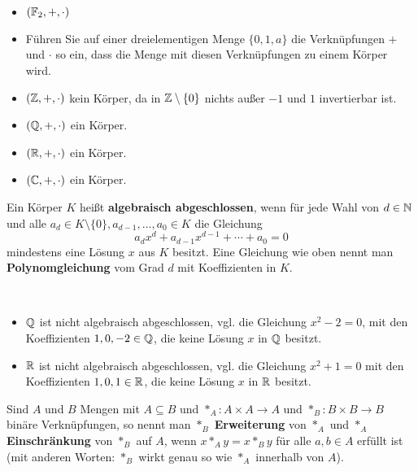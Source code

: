 \begin{bsp}\ 
\begin{itemize} 
	\item $(\mathbb{F}_2,+,\cdot)$
	\item Führen Sie auf einer dreielementigen Menge $\{0,1,a\}$ die Verknüpfungen $+$ und $\cdot$ so ein, dass die Menge mit diesen Verknüpfungen zu einem Körper wird. 
	\item $(\mathbb{Z},+,\cdot)$ kein Körper, da in $\mathbb{Z} \setminus \{0\}$ nichts außer $-1$ und $1$ invertierbar ist. 
	\item $(\mathbb{Q},+,\cdot)$ ein Körper. 
	\item $(\mathbb{R}, + ,\cdot)$ ein Körper. 
	\item $(\mathbb{C}, + ,\cdot)$ ein Körper. 
\end{itemize} 
\end{bsp} 

\begin{defn}
	Ein Körper $K$ heißt \textbf{algebraisch abgeschlossen}, wenn für jede Wahl von $d \in \mathbb{N}$ und alle $a_d \in K \setminus \{0\}, a_{d-1},\ldots,a_0 \in K$ die Gleichung 
	\[
	a_d x^d + a_{d-1} x^{d-1} + \cdots + a_0 = 0
	\]
	mindestens eine Lösung $x$ aus $K$ besitzt. Eine Gleichung wie oben nennt man \textbf{Polynomgleichung} vom Grad $d$ mit Koeffizienten in $K$. 
\end{defn} 

\begin{bsp}\ 
	\begin{itemize} 
		\item $\mathbb{Q}$ ist nicht algebraisch abgeschlossen, vgl. die Gleichung $x^2 - 2 = 0$, mit den Koeffizienten $ 1, 0 , -2 \in \mathbb{Q}$, die keine Lösung $x$ in $\mathbb{Q}$ besitzt. 
		\item $\mathbb{R}$ ist nicht algebraisch abgeschlossen, vgl. die Gleichung $x^2 + 1 = 0$ mit den Koeffizienten $1, 0, 1 \in \mathbb{R}$, die keine Lösung $x$ in $\mathbb{R}$ besitzt. 
	\end{itemize} 
\end{bsp} 

\begin{defn} 
	Sind $A$ und $B$ Mengen mit $A \subseteq B$ und $\ast_A : A \times A \to A$ und $\ast_B : B \times B \to B$ binäre Verknüpfungen, so nennt man $\ast_B$ \textbf{Erweiterung} von $\ast_A$ und $\ast_A$ \textbf{Einschränkung} von $\ast_B$ auf $A$, wenn $x \ast_A y = x \ast_B y$ für alle $a,b \in A$ erfüllt ist (mit anderen Worten: $\ast_B$ wirkt genau so wie $\ast_A$ innerhalb von $A$). 
\end{defn} 

